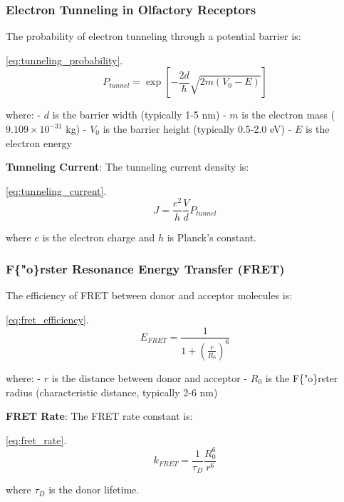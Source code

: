 \documentclass[
  13pt,
  a4paperpaper,
  12pt]{article}
\begin{document}
\subsubsection{Electron Tunneling in Olfactory
Receptors}\label{electron-tunneling-in-olfactory-receptors}

The probability of electron tunneling through a potential barrier is:

\eqref{eq:tunneling_probability}. \begin{equation}
P_{tunnel} = \exp\left[-\frac{2d}{\hbar} \sqrt{2m(V_0 - E)}\right] \label{eq:tunneling_probability}
\end{equation}

where: - \(d\) is the barrier width (typically 1-5 nm) - \(m\) is the
electron mass (\(9.109 \times 10^{-31}\) kg) - \(V_0\) is the barrier
height (typically 0.5-2.0 eV) - \(E\) is the electron energy

\textbf{Tunneling Current}: The tunneling current density is:

\eqref{eq:tunneling_current}. \begin{equation}
J = \frac{e^2}{h} \frac{V}{d} P_{tunnel} \label{eq:tunneling_current}
\end{equation}

where \(e\) is the electron charge and \(h\) is Planck's constant.

\subsubsection{F\{"o\}rster Resonance Energy Transfer
(FRET)}\label{forster-resonance-energy-transfer-fret}

The efficiency of FRET between donor and acceptor molecules is:

\eqref{eq:fret_efficiency}. \begin{equation}
E_{FRET} = \frac{1}{1 + \left(\frac{r}{R_0}\right)^6} \label{eq:fret_efficiency}
\end{equation}

where: - \(r\) is the distance between donor and acceptor - \(R_0\) is
the F\{"o\}rster radius (characteristic distance, typically 2-6 nm)

\textbf{FRET Rate}: The FRET rate constant is:

\eqref{eq:fret_rate}. \begin{equation}
k_{FRET} = \frac{1}{\tau_D} \frac{R_0^6}{r^6} \label{eq:fret_rate}
\end{equation}

where \(\tau_D\) is the donor lifetime.
\end{document}
